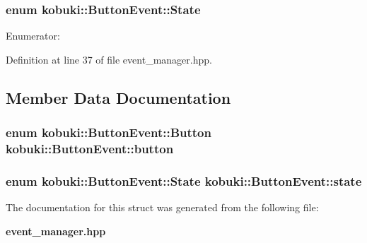 \subsubsection[{\-State}]{\setlength{\rightskip}{0pt plus 5cm}enum {\bf kobuki\-::\-Button\-Event\-::\-State}}\label{structkobuki_1_1ButtonEvent_ad74db533b4ed915d35dcb4dcc3aa424d}
\begin{Desc}
\item[\-Enumerator\-: ]\par
\begin{description}
\item[{\em 
\-Released\label{structkobuki_1_1ButtonEvent_ad74db533b4ed915d35dcb4dcc3aa424da9a45540769414c9ecc57b2e01d3d955c}
}]\item[{\em 
\-Pressed\label{structkobuki_1_1ButtonEvent_ad74db533b4ed915d35dcb4dcc3aa424da028a011233cc9802321d6e1d05824a16}
}]\end{description}
\end{Desc}



\-Definition at line 37 of file event\-\_\-manager.\-hpp.



\subsection{\-Member \-Data \-Documentation}
\subsubsection[{button}]{\setlength{\rightskip}{0pt plus 5cm}enum {\bf kobuki\-::\-Button\-Event\-::\-Button}  {\bf kobuki\-::\-Button\-Event\-::button}}\label{structkobuki_1_1ButtonEvent_aac4f1a9cc793c2ab00da5aaa33ee1dde}
\subsubsection[{state}]{\setlength{\rightskip}{0pt plus 5cm}enum {\bf kobuki\-::\-Button\-Event\-::\-State}  {\bf kobuki\-::\-Button\-Event\-::state}}\label{structkobuki_1_1ButtonEvent_a2f8795d1acf50424c79c05c5637b84db}


\-The documentation for this struct was generated from the following file\-:\begin{DoxyCompactItemize}
\item 
{\bf event\-\_\-manager.\-hpp}\end{DoxyCompactItemize}
